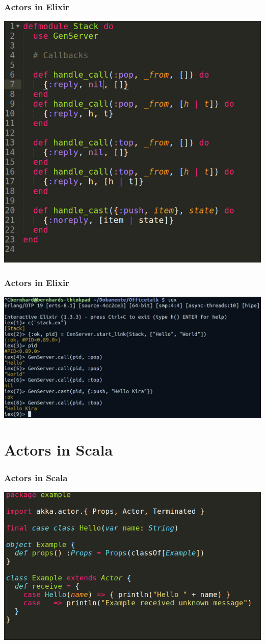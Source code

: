 \documentclass{beamer}
\begin{document}

\begin{frame}
\frametitle{Actors in Elixir}
\includegraphics[width=0.6\linewidth]{./GenServerCode.jpg}
\end{frame}


\begin{frame}
\frametitle{Actors in Elixir}
\includegraphics[width=1.25\linewidth]{./GenServerTerminal.jpg}
\end{frame}


\section{Actors in Scala}


\begin{frame}
\frametitle{Actors in Scala}
\includegraphics[width=1\linewidth]{./scala_example_actor.png}
\end{frame}
\end{document}
